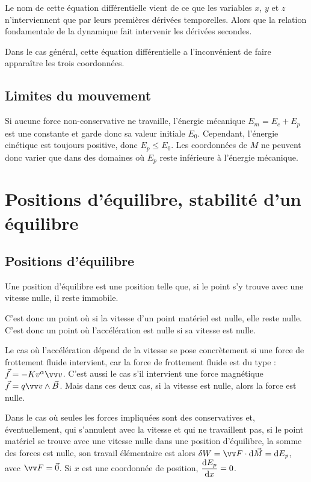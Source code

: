 Le nom de cette équation différentielle vient de ce que les variables $x$, $y$ et $z$ n'interviennent que par leurs premières dérivées temporelles. Alors que la relation fondamentale de la dynamique fait intervenir les dérivées secondes.

Dans le cas général, cette équation différentielle a l'inconvénient de faire apparaître les trois coordonnées.

\subsection{Limites du mouvement}
\label{chap4-subsec:limitesdumvt}

Si aucune force non-conservative ne travaille, l'énergie mécanique $E_m=E_c+E_p$ est une constante et garde donc sa valeur initiale $E_0$. Cependant, l'énergie cinétique est toujours positive, donc $E_p \leq E_0$. Les coordonnées de $M$ ne peuvent donc varier que dans des domaines où $E_p$ reste inférieure à l'énergie mécanique.

\section{Positions d'équilibre, stabilité d'un équilibre}
\label{chap4-sec:positiondequilibre}

\subsection{Positions d'équilibre}
\label{chap4-subsec:positionsdequilibre}

\begin{defdef}
Une position d'équilibre est une position telle que, si le point s'y trouve avec une vitesse nulle, il reste immobile.
\end{defdef}

C'est donc un point où si la vitesse d'un point matériel est nulle, elle reste nulle. C'est donc un point où l'accélération est nulle si sa vitesse est nulle.

Le cas où l'accélération dépend de la vitesse se pose concrètement si une force de frottement fluide intervient, car la force de frottement fluide est du type : $\vec{f}=-Kv^{\alpha}\vvv$. C'est aussi le cas s'il intervient une force magnétique $\vec{f} = q\vvv \wedge \vec{B}$. Mais dans ces deux cas, si la vitesse est nulle, alors la force est nulle.

Dans le cas où seules les forces impliquées sont des conservatives et, éventuellement, qui s'annulent avec la vitesse et qui ne travaillent pas, si le point matériel se trouve avec une vitesse nulle dans une position d'équilibre, la somme des forces est nulle, son travail élémentaire est alors $\delta W=\vF \cdot \D\vec{M}=\D E_p$, avec $\vF=\vec{0}$. Si $x$ est une coordonnée de position, $\dfrac{\mathrm{d} E_p}{\mathrm{d} x}=0$.


